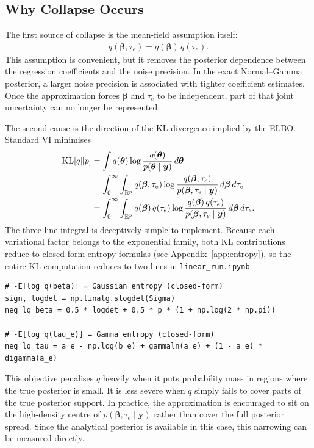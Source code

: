 \documentclass[11pt,a4paper]{article}
\newcommand{\R}{\mathbb{R}}
\begin{document}
\subsection{Why Collapse Occurs}

The first source of collapse is the mean-field assumption itself:
\begin{align}
q(\bm{\beta},\tau_e) = q(\bm{\beta})\,q(\tau_e).
\end{align}
This assumption is convenient, but it removes the posterior dependence between the regression coefficients and the noise precision. In the exact Normal--Gamma posterior, a larger noise precision is associated with tighter coefficient estimates. Once the approximation forces $\bm{\beta}$ and $\tau_e$ to be independent, part of that joint uncertainty can no longer be represented.

The second cause is the direction of the KL divergence implied by the ELBO. Standard VI minimises
\begin{align}
\mathrm{KL}[q\|p] &= \int q(\bm{\theta})\log\frac{q(\bm{\theta})}{p(\bm{\theta}\mid\bm{y})}\,d\bm{\theta} \notag\\
                   &= \int_0^\infty \int_{\R^p} q(\bm{\beta},\tau_e)\log\frac{q(\bm{\beta},\tau_e)}{p(\bm{\beta},\tau_e\mid\bm{y})}\,d\bm{\beta}\,d\tau_e \notag\\
                   &= \int_0^\infty \int_{\R^p} q(\bm{\beta})\,q(\tau_e)\log\frac{q(\bm{\beta})\,q(\tau_e)}{p(\bm{\beta},\tau_e\mid\bm{y})}\,d\bm{\beta}\,d\tau_e.
\end{align}
The three-line integral is deceptively simple to implement.
Because each variational factor belongs to the exponential family, both KL contributions reduce to closed-form entropy formulas (see Appendix~\ref{app:entropy}),
so the entire KL computation reduces to two lines in \texttt{linear\_run.ipynb}:
\begin{verbatim}
# -E[log q(beta)] = Gaussian entropy (closed-form)
sign, logdet = np.linalg.slogdet(Sigma)
neg_lq_beta = 0.5 * logdet + 0.5 * p * (1 + np.log(2 * np.pi))

# -E[log q(tau_e)] = Gamma entropy (closed-form)
neg_lq_tau = a_e - np.log(b_e) + gammaln(a_e) + (1 - a_e) * digamma(a_e)
\end{verbatim}

This objective penalises $q$ heavily when it puts probability mass in regions where the true posterior is small. It is less severe when $q$ simply fails to cover parts of the true posterior support. In practice, the approximation is encouraged to sit on the high-density centre of $p(\bm{\beta},\tau_e\mid\bm{y})$ rather than cover the full posterior spread. Since the analytical posterior is available in this case, this narrowing can be measured directly.
\end{document}
